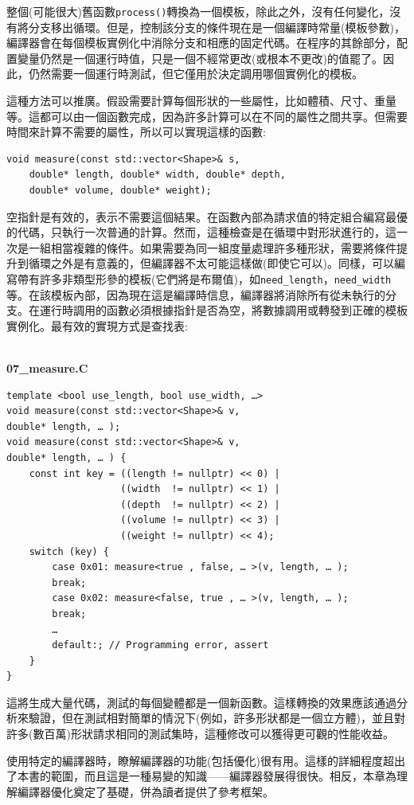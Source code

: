 整個(可能很大)舊函數\texttt{process()}轉換為一個模板，除此之外，沒有任何變化，沒有將分支移出循環。但是，控制該分支的條件現在是一個編譯時常量(模板參數)，編譯器會在每個模板實例化中消除分支和相應的固定代碼。在程序的其餘部分，配置變量仍然是一個運行時值，只是一個不經常更改(或根本不更改)的值罷了。因此，仍然需要一個運行時測試，但它僅用於決定調用哪個實例化的模板。

這種方法可以推廣。假設需要計算每個形狀的一些屬性，比如體積、尺寸、重量等。這都可以由一個函數完成，因為許多計算可以在不同的屬性之間共享。但需要時間來計算不需要的屬性，所以可以實現這樣的函數:

\begin{lstlisting}[style=styleCXX]
void measure(const std::vector<Shape>& s,
	double* length, double* width, double* depth,
	double* volume, double* weight);
\end{lstlisting}

空指針是有效的，表示不需要這個結果。在函數內部為請求值的特定組合編寫最優的代碼，只執行一次普通的計算。然而，這種檢查是在循環中對形狀進行的，這一次是一組相當複雜的條件。如果需要為同一組度量處理許多種形狀，需要將條件提升到循環之外是有意義的，但編譯器不太可能這樣做(即使它可以)。同樣，可以編寫帶有許多非類型形參的模板(它們將是布爾值)，如\texttt{need\_length}，\texttt{need\_width}等。在該模板內部，因為現在這是編譯時信息，編譯器將消除所有從未執行的分支。在運行時調用的函數必須根據指針是否為空，將數據調用或轉發到正確的模板實例化。最有效的實現方式是查找表:

\hspace*{\fill} \\ %
\noindent
\textbf{07\_measure.C}
\begin{lstlisting}[style=styleCXX]
template <bool use_length, bool use_width, …>
void measure(const std::vector<Shape>& v,
double* length, … );
void measure(const std::vector<Shape>& v,
double* length, … ) {
	const int key = ((length != nullptr) << 0) |
					((width  != nullptr) << 1) |
				    ((depth  != nullptr) << 2) |
				    ((volume != nullptr) << 3) |
				    ((weight != nullptr) << 4);
	switch (key) {
		case 0x01: measure<true , false, … >(v, length, … );
		break;
		case 0x02: measure<false, true , … >(v, length, … );
		break;
		…
		default:; // Programming error, assert
	}
}
\end{lstlisting}

這將生成大量代碼，測試的每個變體都是一個新函數。這樣轉換的效果應該通過分析來驗證，但在測試相對簡單的情況下(例如，許多形狀都是一個立方體)，並且對許多(數百萬)形狀請求相同的測試集時，這種修改可以獲得更可觀的性能收益。 

使用特定的編譯器時，瞭解編譯器的功能(包括優化)很有用。這樣的詳細程度超出了本書的範圍，而且這是一種易變的知識——編譯器發展得很快。相反，本章為理解編譯器優化奠定了基礎，併為讀者提供了參考框架。


